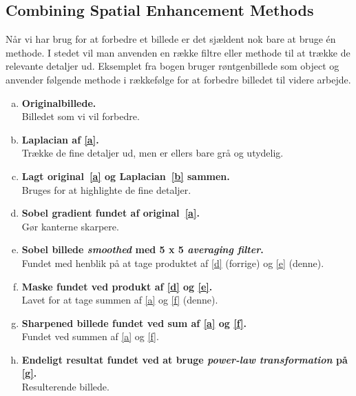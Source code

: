 \subsection{Combining Spatial Enhancement Methods}
Når vi har brug for at forbedre et billede er det sjældent nok bare at bruge én methode. I stedet vil man anvenden en række filtre eller methode til at trække de relevante detaljer ud. Eksemplet fra bogen bruger røntgenbillede som object og anvender følgende methode i rækkefølge for at forbedre billedet til videre arbejde. 

\begin{enumerate}[(a)]
	\item \textbf{Originalbillede.}\label{a}\\
	Billedet som vi vil forbedre.
	
	\item \textbf{Laplacian af \ref{a}.}\label{b}\\
	Trække de fine detaljer ud, men er ellers bare grå og utydelig.
		
	\item \textbf{Lagt original~\ref{a} og Laplacian~\ref{b} sammen.}\label{c}\\
	Bruges for at highlighte de fine detaljer.

	\item \textbf{Sobel gradient fundet af original~\ref{a}.}\label{d}\\
	Gør kanterne skarpere.

	\item \textbf{Sobel billede \textit{smoothed} med 5 x 5 \textit{averaging filter}.}\label{e}\\
	Fundet med henblik på at tage produktet af \ref{d} (forrige) og \ref{e} (denne).

	\item \textbf{Maske fundet ved produkt af \ref{d} og \ref{e}.}\label{f}\\
	Lavet for at tage summen af \ref{a} og \ref{f} (denne).

	\item \textbf{Sharpened billede fundet ved sum af \ref{a} og \ref{f}.}\label{g}\\
	Fundet ved summen af \ref{a} og \ref{f}.

	\item \textbf{Endeligt resultat fundet ved at bruge \textit{power-law transformation} på \ref{g}.}\label{h}\\
	Resulterende billede.	
\end{enumerate}

